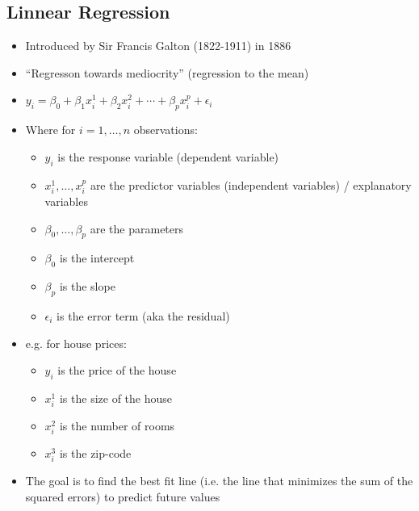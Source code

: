 \documentclass[12pt]{article}
\begin{document}
        \subsection{Linnear Regression}
            \begin{itemize}
                \item Introduced by Sir Francis Galton (1822-1911) in 1886
                \item ``Regresson towards mediocrity'' (regression to the mean)
                \item $y_i = \beta_0 + \beta_1 x_i^1 + \beta_2 x_i^2 + \cdots + \beta_p x_i^p + \epsilon_i$
                \item Where for $i = 1, \ldots, n$ observations:
                \begin{itemize}
                    \item $y_i$ is the response variable (dependent variable)
                    \item $x_i^1, \ldots, x_i^p$ are the predictor variables (independent variables) / explanatory variables
                    \item $\beta_0, \ldots, \beta_p$ are the parameters
                    \item $\beta_0$ is the intercept
                    \item $\beta_p$ is the slope
                    \item $\epsilon_i$ is the error term (aka the residual)
                \end{itemize}
                \item e.g. for house prices:
                \begin{itemize}
                    \item $y_i$ is the price of the house
                    \item $x_i^1$ is the size of the house
                    \item $x_i^2$ is the number of rooms
                    \item $x_i^3$ is the zip-code
                \end{itemize}
                \item The goal is to find the best fit line (i.e. the line that minimizes the sum of the squared errors) to predict future values
            \end{itemize}
\end{document}
